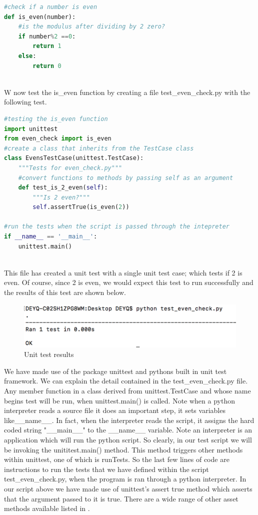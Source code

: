 \documentclass[11pt, oneside]{article}   	%
\begin{document}
\begin{lstlisting}[language = python]
#check if a number is even
def is_even(number):
    #is the modulus after dividing by 2 zero?
    if number%2 ==0:
        return 1
    else:
        return 0
        
\end{lstlisting}

W now test the is\_even function by creating a file test\_even\_check.py with the following test.
\\
\begin{lstlisting}[language = python]
#testing the is_even function 
import unittest
from even_check import is_even
#create a class that inherits from the TestCase class
class EvensTestCase(unittest.TestCase):
    """Tests for even_check.py"""
    #convert functions to methods by passing self as an argument
    def test_is_2_even(self):
        """Is 2 even?"""
        self.assertTrue(is_even(2))

#run the tests when the script is passed through the intepreter
if __name__ == '__main__':
    unittest.main()
    
\end{lstlisting}

This file has created a unit test with a single unit test case; which tests if 2 is even. Of course, since 2 is even,  we would expect this test to run successfully and the results of this test are shown below.

\begin{figure}[h]\label{fig:roc1}
  \includegraphics[width=0.5\linewidth,center] {unit_test_results.png}
  \caption{Unit test results}
\end{figure}

We have made use of the package unittest and pythons built in unit test framework. We can explain the detail contained in the test\_even\_check.py file. Any member function in a class derived from unittest.TestCase and whose name begins test will be run, when unittest.main() is called. Note when a python interpreter reads a source file it does an important step, it sets variables like\_\_name\_\_. In fact,  when the interpreter reads the script, it assigns the hard coded string "\_\_main\_\_" to the \_\_name\_\_ variable. Note an interpreter is an application which will  run the python script. So clearly, in our test script we will be invoking the unititest.main() method. This method triggers other methods within unittest, one of which is runTests. So the last few lines of code are instructions to run the tests that we have defined within the script test\_even\_check.py, when the program is ran through a python interpreter. In our script above we have made use of unittest's assert true method which asserts that the argument passed to it is true. There are a wide range of other asset methods available listed in \cite{WEBSITE:4}.
\end{document}
